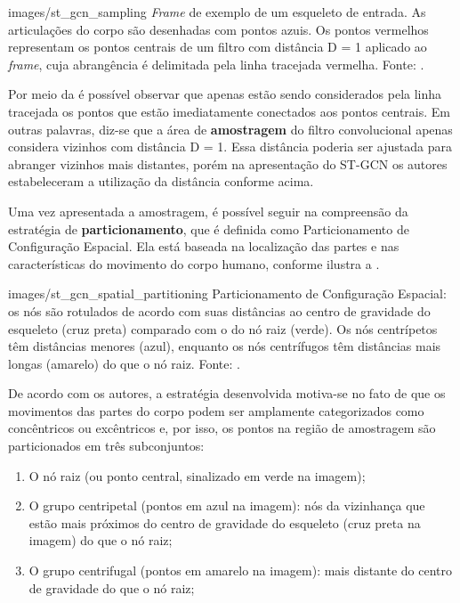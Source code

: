     {images/st_gcn_sampling}
    {\textit{Frame} de exemplo de um esqueleto de entrada. As articulações do corpo são desenhadas com pontos azuis. Os pontos vermelhos representam os pontos centrais de um filtro com distância D = 1 aplicado ao \textit{frame}, cuja abrangência é delimitada pela linha tracejada vermelha. Fonte: \cite[p. 5]{st-gcn-2018}.}

Por meio da  é possível observar que apenas estão sendo considerados pela linha tracejada os pontos que estão imediatamente conectados aos pontos centrais. Em outras palavras, diz-se que a área de \textbf{amostragem} do filtro convolucional apenas considera vizinhos com distância D = 1. Essa distância poderia ser ajustada para abranger vizinhos mais distantes, porém na apresentação do ST-GCN \cite{st-gcn-2018} os autores estabeleceram a utilização da distância conforme acima.

Uma vez apresentada a amostragem, é possível seguir na compreensão da estratégia de \textbf{particionamento}, que é definida como Particionamento de Configuração Espacial. Ela está baseada na localização das partes e nas características do movimento do corpo humano, conforme ilustra a .

    {images/st_gcn_spatial_partitioning}
    {Particionamento de Configuração Espacial: os nós são rotulados de acordo com suas distâncias ao centro de gravidade do esqueleto (cruz preta) comparado com o do nó raiz (verde). Os nós centrípetos têm distâncias menores (azul), enquanto os nós centrífugos têm distâncias mais longas (amarelo) do que o nó raiz. Fonte: \cite[p. 5]{st-gcn-2018}.}

De acordo com os autores, a estratégia desenvolvida motiva-se no fato de que os movimentos das partes do corpo podem ser amplamente categorizados como concêntricos ou excêntricos e, por isso, os pontos na região de amostragem são particionados em três subconjuntos:

\begin{enumerate}
    \item O nó raiz (ou ponto central, sinalizado em verde na imagem);
    \item O grupo centripetal (pontos em azul na imagem): nós da vizinhança que estão mais próximos do centro de gravidade do esqueleto (cruz preta na imagem) do que o nó raiz;
    \item O grupo centrifugal (pontos em amarelo na imagem): mais distante do centro de gravidade do que o nó raiz;
\end{enumerate}

